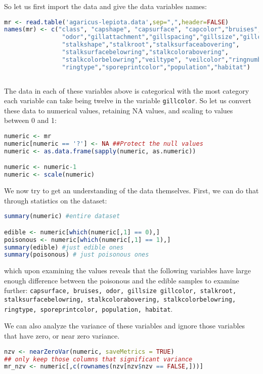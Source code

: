 \documentclass{article}
\begin{document}
So let us first import the data and give the data variables names:

\begin{lstlisting}[language=R, frame=single]
mr <- read.table('agaricus-lepiota.data',sep=",",header=FALSE)
names(mr) <- c("class", "capshape", "capsurface", "capcolor","bruises",
                "odor","gillattachment","gillspacing","gillsize","gillcolor",
                "stalkshape","stalkroot","stalksurfaceabovering",
                "stalksurfacebelowring","stalkcolorabovering",
                "stalkcolorbelowring","veiltype", "veilcolor","ringnumber",
                "ringtype","sporeprintcolor","population","habitat")
    
\end{lstlisting}

The data in each of these variables above is categorical with the most category each variable can take being twelve in the variable \texttt{gillcolor}. So let us convert these data to numerical values, retaining NA values, and scaling to values between 0 and 1:

\begin{lstlisting}[language=R, frame=single]
numeric <- mr
numeric[numeric == '?'] <- NA ##Protect the null values
numeric <- as.data.frame(sapply(numeric, as.numeric))

numeric <- numeric-1
numeric <- scale(numeric)
\end{lstlisting}

We now try to get an understanding of the data themselves. First, we can do that through statistics on the dataset:

\begin{lstlisting}[language=R, frame = single]
summary(numeric) #entire dataset

edible <- numeric[which(numeric[,1] == 0),]
poisonous <- numeric[which(numeric[,1] == 1),]
summary(edible) #just edible ones
summary(poisonous) # just poisonous ones
\end{lstlisting}

\noindent which upon examining the values reveals that the following variables have large enough difference between the poisonous and the edible samples to examine further: \texttt{capsurface, bruises, odor, gillsize gillcolor, stalkroot, stalksurfacebelowring, stalkcolorabovering, stalkcolorbelowring, ringtype, sporeprintcolor, population, habitat}. 

We can also analyze the variance of these variables and ignore those variables that have zero, or near zero variance.
\begin{lstlisting}[language=R, frame=single]
nzv <- nearZeroVar(numeric, saveMetrics = TRUE)
## only keep those columns that significant variance
mr_nzv <- numeric[,c(rownames(nzv[nzv$nzv == FALSE,]))]
\end{lstlisting}
\end{document}
